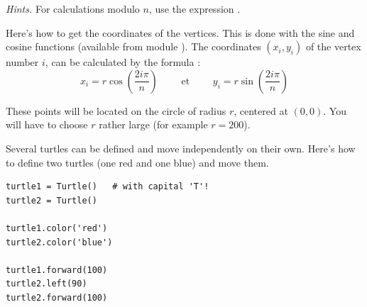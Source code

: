 \documentclass[11pt,class=report,crop=false]{standalone}
\begin{document}
\begin{activite}
\emph{Hints.} For calculations modulo $n$, use the expression .


Here's how to get the coordinates of the vertices. This is done with the sine and cosine functions (available from module ).
The coordinates $(x_i,y_i)$ of the vertex number $i$, can be calculated by the formula :
$$x_i = r \cos\left(\frac{2 i \pi}{n}\right) \qquad \text{ et } \qquad y_i = r\sin\left(\frac{2 i \pi}{n}\right)$$

These points will be located on the circle of radius $r$, centered at $(0,0)$. 
You will have to choose $r$ rather large (for example $r=200$).



\end{activite}


\begin{cours}

Several turtles can be defined and move independently on their own.
Here's how to define two turtles (one red and one blue) and move them.

\begin{lstlisting}
turtle1 = Turtle()   # with capital 'T'!
turtle2 = Turtle()

turtle1.color('red')
turtle2.color('blue')

turtle1.forward(100)
turtle2.left(90)
turtle2.forward(100)
\end{lstlisting}

\end{cours}


\end{document}
